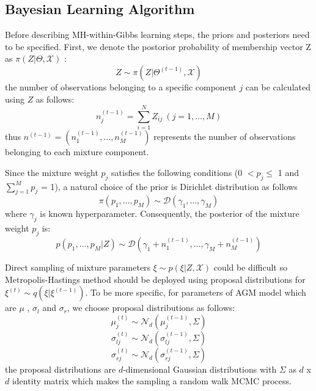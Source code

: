 \subsection{Bayesian Learning Algorithm}
\label{sec:2.2}
Before describing MH-within-Gibbs learning steps, the priors and posteriors need to be specified. First, we denote the postorior probability of membership vector Z as $\pi(Z|\Theta,\mathcal{X})$ \cite{Elguebaly2011}:
\begin{equation}
Z \sim \pi(Z|\Theta^{(t-1)},\mathcal{X})
\label{eq:5}
\end{equation}
the number of observations belonging to a specific component $j$ can be calculated using $Z$ as follows:
\begin{equation}
n_j^{(t-1)} = \sum_{i=1}^NZ_{ij}\ (j = 1,...,M) 
\label{eq:6}
\end{equation}
thus $n^{(t-1)}=(n_1^{(t-1)},...,n_M^{(t-1)})$ represents the number of observations belonging to each mixture component.

Since the mixture weight $p_j$ satisfies the following conditions (0 $< p_j \leq$ 1 and $\sum_{j=1}^Mp_j$ = 1), a natural choice of the prior is Dirichlet distribution as follows \cite{Bouguila2004,Bouguila2004a} 
\begin{equation}
\pi(p_1,\ldots,p_M) \sim \mathcal{D}(\gamma_1,...,\gamma_M )
\label{eq:7}
\end{equation}
where $\gamma_j$ is known hyperparameter. Consequently, the posterior of the mixture weight $p_j$ is:
\begin{equation}
p(p_1,\ldots,p_M|Z) \sim \mathcal{D}(\gamma_1 + n_1^{(t-1)},...,\gamma_M + n_M^{(t-1)})
\label{eq:8}
\end{equation}


Direct sampling of mixture parameters $\xi \sim p(\xi|Z,\mathcal{X})$ could be difficult so Metropolis-Hastings method should be deployed using proposal distributions for $\xi^{(t)} \sim q(\xi|\xi^{(t-1)})$. To be more specific, for parameters of AGM model which are $\mu$ , $\sigma_l$ and $\sigma_r$, we choose proposal distributions as follows:
\begin{equation}
\mu_j^{(t)} \sim \mathcal{N}_d(\mu_j^{(t-1)},\Sigma)
\label{eq:9}
\end{equation}
\begin{equation}
\sigma_{lj}^{(t)} \sim \mathcal{N}_d(\sigma_{lj}^{(t-1)},\Sigma)
\label{eq:10}
\end{equation}
\begin{equation}
\sigma_{rj}^{(t)} \sim \mathcal{N}_d(\sigma_{rj}^{(t-1)},\Sigma)
\label{eq:11}
\end{equation}
the proposal distributions are $d$-dimensional Gaussian distributions with $\Sigma$ as $d$ x $d$ identity matrix which makes the sampling a random walk MCMC process.

